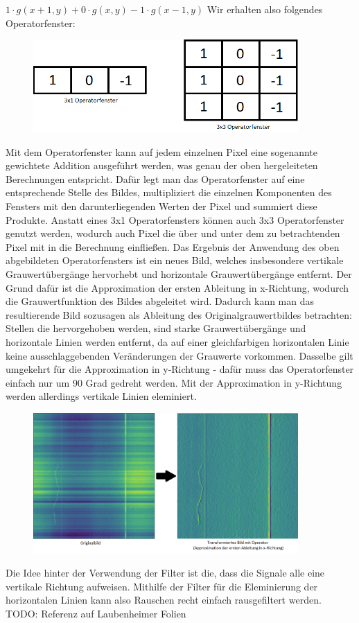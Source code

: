 \documentclass[12pt, a4paper]{article}
\begin{document}
$1\cdot g(x+1,y)+0\cdot g(x,y)-1\cdot g(x-1,y)$
\newline
Wir erhalten also folgendes Operatorfenster:
\begin{figure}[h]
\centering
\includegraphics[width=0.9\textwidth]{img/operatorfenster.png}
\end{figure}
\newline
Mit dem Operatorfenster kann auf jedem einzelnen Pixel eine sogenannte gewichtete Addition ausgeführt werden, was genau der oben hergeleiteten Berechnungen entspricht. Dafür legt man das Operatorfenster auf eine entsprechende Stelle des Bildes, multipliziert die einzelnen Komponenten des Fensters mit den darunterliegenden Werten der Pixel und summiert diese Produkte. Anstatt eines 3x1 Operatorfensters können auch 3x3 Operatorfenster genutzt werden, wodurch auch Pixel die über und unter dem zu betrachtenden Pixel mit in die Berechnung einfließen. Das Ergebnis der Anwendung des oben abgebildeten Operatorfensters ist ein neues Bild, welches insbesondere vertikale Grauwertübergänge hervorhebt und horizontale Grauwertübergänge entfernt. Der Grund dafür ist die Approximation der ersten Ableitung in x-Richtung, wodurch die Grauwertfunktion des Bildes abgeleitet wird. Dadurch kann man das resultierende Bild sozusagen als Ableitung des Originalgrauwertbildes betrachten: Stellen die hervorgehoben werden, sind starke Grauwertübergänge und horizontale Linien werden entfernt, da auf einer gleichfarbigen horizontalen Linie keine ausschlaggebenden Veränderungen der Grauwerte vorkommen. Dasselbe gilt umgekehrt für die Approximation in y-Richtung - dafür muss das Operatorfenster einfach nur um 90 Grad gedreht werden. Mit der Approximation in y-Richtung werden allerdings vertikale Linien eleminiert.
\begin{figure}[h]
\centering
\includegraphics[width=0.9\textwidth]{img/original-vs-cv.png}
\end{figure}
\newline
Die Idee hinter der Verwendung der Filter ist die, dass die Signale alle eine vertikale Richtung aufweisen. Mithilfe der Filter für die Eleminierung der horizontalen Linien kann also Rauschen recht einfach rausgefiltert werden.
TODO: Referenz auf Laubenheimer Folien
\end{document}

